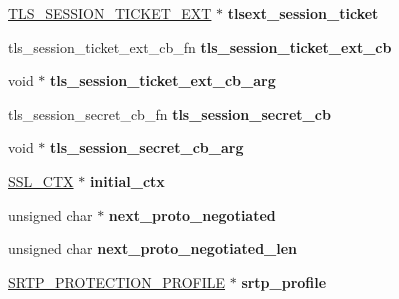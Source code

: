 \begin{DoxyCompactItemize}
\item 
\mbox{\label{structssl__st_a88b1275f3d5733e3e856fe8c09d18566}} 
\hyperlink{structtls__session__ticket__ext__st}{T\+L\+S\+\_\+\+S\+E\+S\+S\+I\+O\+N\+\_\+\+T\+I\+C\+K\+E\+T\+\_\+\+E\+XT} $\ast$ {\bfseries tlsext\+\_\+session\+\_\+ticket}
\item 
\mbox{\label{structssl__st_adfbd96d1abce945f541c432379fc994f}} 
tls\+\_\+session\+\_\+ticket\+\_\+ext\+\_\+cb\+\_\+fn {\bfseries tls\+\_\+session\+\_\+ticket\+\_\+ext\+\_\+cb}
\item 
\mbox{\label{structssl__st_a45dd63c101fc5b96773ab292285962a4}} 
void $\ast$ {\bfseries tls\+\_\+session\+\_\+ticket\+\_\+ext\+\_\+cb\+\_\+arg}
\item 
\mbox{\label{structssl__st_aff0b13d0e1261db9771d7cf0e64cc5cc}} 
tls\+\_\+session\+\_\+secret\+\_\+cb\+\_\+fn {\bfseries tls\+\_\+session\+\_\+secret\+\_\+cb}
\item 
\mbox{\label{structssl__st_a3e4db63ea16d50062c8b2b062bb648d9}} 
void $\ast$ {\bfseries tls\+\_\+session\+\_\+secret\+\_\+cb\+\_\+arg}
\item 
\mbox{\label{structssl__st_a704ffea820953b3ca385ce14e6efe570}} 
\hyperlink{structssl__ctx__st}{S\+S\+L\+\_\+\+C\+TX} $\ast$ {\bfseries initial\+\_\+ctx}
\item 
\mbox{\label{structssl__st_aef796f12c3e90c045baad0cd1841e180}} 
unsigned char $\ast$ {\bfseries next\+\_\+proto\+\_\+negotiated}
\item 
\mbox{\label{structssl__st_aa530fc5efd1d6b0f5f881dbd78b6d3de}} 
unsigned char {\bfseries next\+\_\+proto\+\_\+negotiated\+\_\+len}
\item 
\mbox{\label{structssl__st_ae8776b7b0b446fb823d9f87176bcfa1d}} 
\hyperlink{structsrtp__protection__profile__st}{S\+R\+T\+P\+\_\+\+P\+R\+O\+T\+E\+C\+T\+I\+O\+N\+\_\+\+P\+R\+O\+F\+I\+LE} $\ast$ {\bfseries srtp\+\_\+profile}
\item 
\mbox{\label{structssl__st_a8ad372425499d47c2254c89fbcd0deed}} 

\end{DoxyCompactItemize}
